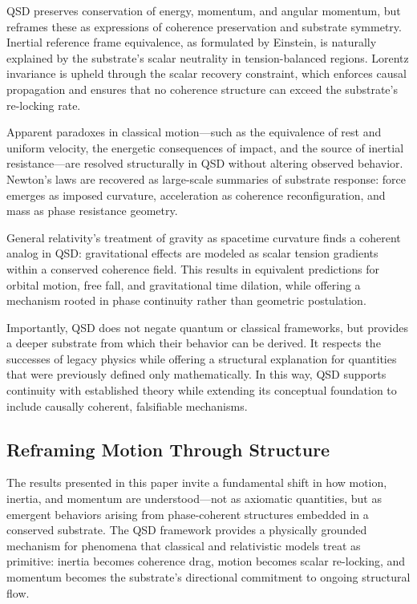 \documentclass[entropy,article,submit,pdftex,moreauthors]{Definitions/mdpi}
\begin{document}
QSD preserves conservation of energy, momentum, and angular momentum, but reframes these as expressions of coherence preservation and substrate symmetry. Inertial reference frame equivalence, as formulated by Einstein, is naturally explained by the substrate’s scalar neutrality in tension-balanced regions. Lorentz invariance is upheld through the scalar recovery constraint, which enforces causal propagation and ensures that no coherence structure can exceed the substrate’s re-locking rate.

Apparent paradoxes in classical motion---such as the equivalence of rest and uniform velocity, the energetic consequences of impact, and the source of inertial resistance---are resolved structurally in QSD without altering observed behavior. Newton’s laws are recovered as large-scale summaries of substrate response: force emerges as imposed curvature, acceleration as coherence reconfiguration, and mass as phase resistance geometry.

General relativity’s treatment of gravity as spacetime curvature finds a coherent analog in QSD: gravitational effects are modeled as scalar tension gradients within a conserved coherence field. This results in equivalent predictions for orbital motion, free fall, and gravitational time dilation, while offering a mechanism rooted in phase continuity rather than geometric postulation.

Importantly, QSD does not negate quantum or classical frameworks, but provides a deeper substrate from which their behavior can be derived. It respects the successes of legacy physics while offering a structural explanation for quantities that were previously defined only mathematically. In this way, QSD supports continuity with established theory while extending its conceptual foundation to include causally coherent, falsifiable mechanisms.
\subsection{Reframing Motion Through Structure}

The results presented in this paper invite a fundamental shift in how motion, inertia, and momentum are understood—not as axiomatic quantities, but as emergent behaviors arising from phase-coherent structures embedded in a conserved substrate. The QSD framework provides a physically grounded mechanism for phenomena that classical and relativistic models treat as primitive: inertia becomes coherence drag, motion becomes scalar re-locking, and momentum becomes the substrate’s directional commitment to ongoing structural flow.
\end{document}
